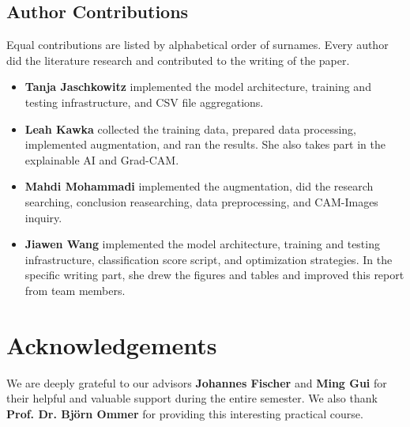 \subsection*{Author Contributions}
\label{sec:author}
Equal contributions are listed by alphabetical order of surnames. 
Every author did the literature research and contributed to the writing of the paper. 

\begin{itemize}
  \item \textbf{Tanja Jaschkowitz} implemented the model architecture, training and testing infrastructure, and CSV file aggregations. 
  \item \textbf{Leah Kawka} collected the training data, prepared data processing, implemented augmentation, and ran the results. 
  She also takes part in the explainable AI and Grad-CAM.
  \item \textbf{Mahdi Mohammadi} implemented the augmentation, did the research searching, conclusion reasearching, data preprocessing, and CAM-Images inquiry.
  \item \textbf{Jiawen Wang} implemented the model architecture, training and testing infrastructure, classification score script, and optimization strategies. 
  In the specific writing part, she drew the figures and tables and improved this report from team members.
\end{itemize}

\section*{Acknowledgements}

We are deeply grateful to our advisors \textbf{Johannes Fischer} and \textbf{Ming Gui} for their helpful and valuable support during the entire semester. 
We also thank \textbf{Prof. Dr. Björn Ommer} for providing this interesting practical course.
